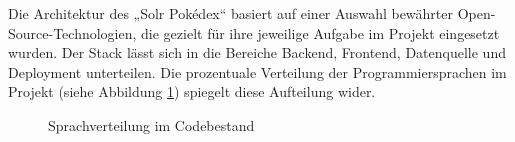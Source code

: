 Die Architektur des „Solr Pokédex“ basiert auf einer Auswahl bewährter Open-Source-Technologien, die gezielt für ihre jeweilige Aufgabe im Projekt eingesetzt wurden. Der Stack lässt sich in die Bereiche Backend, Frontend, Datenquelle und Deployment unterteilen. Die prozentuale Verteilung der Programmiersprachen im Projekt (siehe Abbildung \ref{fig:language-distribution}) spiegelt diese Aufteilung wider.

\begin{figure}[h!]
\centering
{}
\caption{Sprachverteilung im Codebestand}
\label{fig:language-distribution}
\end{figure}


